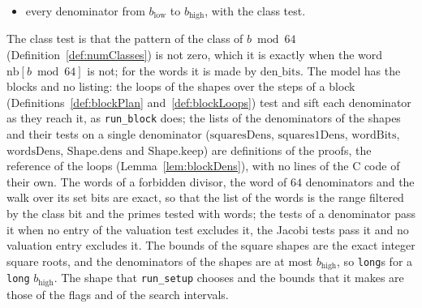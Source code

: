 \begin{definition}
\begin{itemize}
      each prime tested with words, the bits below $b_{\mathrm{low}}$ and above $b_{\mathrm{high}}$
      cleared in the first and the last word, and its set bits $j$, lowest first, giving $64 w + j$,
      each tested by the Jacobi test by tables, the valuation entries, and, with the Jacobi switch
      on and no tables, the binary algorithm (,
      );
    \item every denominator from $b_{\mathrm{low}}$ to $b_{\mathrm{high}}$, with the class test.
  \end{itemize}
  The class test is that the pattern of the class of $b \bmod 64$ (Definition~\ref{def:numClasses})
  is not zero, which it is exactly when the word $\mathrm{nb}[b \bmod 64]$ is not; for the words it
  is made by $\mathrm{den\_bits}$. The model has the blocks and no listing: the loops of the shapes
  over the steps of a block (Definitions~\ref{def:blockPlan} and~\ref{def:blockLoops}) test and sift
  each denominator as they reach it, as \verb|run_block| does; the lists of the denominators of the
  shapes and their tests on a single denominator ($\mathrm{squaresDens}$, $\mathrm{squares1Dens}$,
  $\mathrm{wordBits}$, $\mathrm{wordsDens}$, $\mathrm{Shape.dens}$ and $\mathrm{Shape.keep}$) are
  definitions of the proofs, the reference of the loops (Lemma~\ref{lem:blockDens}), with no lines
  of the C code of their own. The words of a forbidden divisor, the word of $64$ denominators and
  the walk over its set bits are exact, so that the list of the words is the range filtered by the
  class bit and the primes tested with words; the tests of a denominator pass it when no entry of
  the valuation test excludes it, the Jacobi tests pass it and no valuation entry excludes it. The
  bounds of the square shapes are the exact integer square roots, and the denominators of the shapes
  are at most $b_{\mathrm{high}}$, so \verb|long|s for a \verb|long| $b_{\mathrm{high}}$. The shape
  that \verb|run_setup| chooses and the bounds that it makes are those of the flags and of the
  search intervals.
\end{definition}


